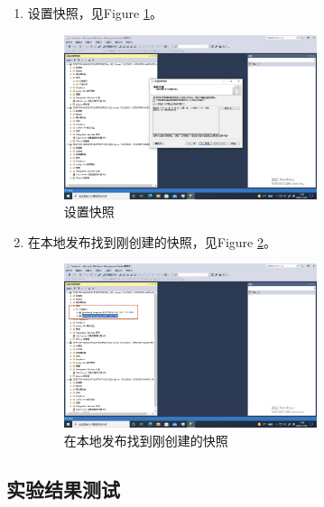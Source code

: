 \documentclass[onecolumn,oneside]{BUPTHomework}
\begin{document}
\begin{enumerate}
  \item 设置快照，见Figure \ref{pic21}。

  \begin{figure}[h]
    \centering
    \includegraphics[width=0.70\textwidth]{image/pic21.png}
    \caption{设置快照}
    \label{pic21}
  \end{figure}

  \item 在本地发布找到刚创建的快照，见Figure \ref{pic22}。
  
  \newpage

  \begin{figure}[h]
    \centering
    \includegraphics[width=0.70\textwidth]{image/pic22.png}
    \caption{在本地发布找到刚创建的快照}
    \label{pic22}
  \end{figure}

  \end{enumerate}

  \subsection{实验结果测试}
\end{document}
